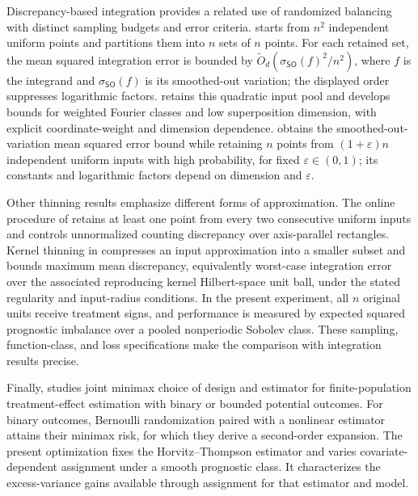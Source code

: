 \documentclass[11pt]{article}
\begin{document}
Discrepancy-based integration provides a related use of randomized balancing with distinct sampling budgets and error criteria. \citet[Theorem 1.1 and Section 3.1]{BansalJiang2024QMC} starts from \(n^2\) independent uniform points and partitions them into \(n\) sets of \(n\) points. For each retained set, the mean squared integration error is bounded by \(\widetilde O_d(\sigma_{\mathsf{SO}}(f)^2/n^2)\), where \(f\) is the integrand and \(\sigma_{\mathsf{SO}}(f)\) is its smoothed-out variation; the displayed order suppresses logarithmic factors. \citet[Theorem 1.1, Section 2.2, and Theorem 3.3]{ChenJiangKirk2025HighDimensionalQMC} retains this quadratic input pool and develops bounds for weighted Fourier classes and low superposition dimension, with explicit coordinate-weight and dimension dependence. \citet[Theorem 1.2]{EzeunalaJhaJiang2026QMCII} obtains the smoothed-out-variation mean squared error bound while retaining \(n\) points from \((1+\varepsilon)n\) independent uniform inputs with high probability, for fixed \(\varepsilon\in(0,1)\); its constants and logarithmic factors depend on dimension and \(\varepsilon\).

Other thinning results emphasize different forms of approximation. The online procedure of \citet[Theorems 1--2]{Dwivedi2019} retains at least one point from every two consecutive uniform inputs and controls unnormalized counting discrepancy over axis-parallel rectangles. Kernel thinning in \citet[Theorem 1 and Corollary 1]{Dwivedi2024} compresses an input approximation into a smaller subset and bounds maximum mean discrepancy, equivalently worst-case integration error over the associated reproducing kernel Hilbert-space unit ball, under the stated regularity and input-radius conditions. In the present experiment, all \(n\) original units receive treatment signs, and performance is measured by expected squared prognostic imbalance over a pooled nonperiodic Sobolev class. These sampling, function-class, and loss specifications make the comparison with integration results precise.

Finally, \citet[Theorems 2.2--2.3 and 3.1]{SudijonoDobribanTchetgen2026Minimax} studies joint minimax choice of design and estimator for finite-population treatment-effect estimation with binary or bounded potential outcomes. For binary outcomes, Bernoulli randomization paired with a nonlinear estimator attains their minimax risk, for which they derive a second-order expansion. The present optimization fixes the Horvitz--Thompson estimator and varies covariate-dependent assignment under a smooth prognostic class. It characterizes the excess-variance gains available through assignment for that estimator and model.
\end{document}
